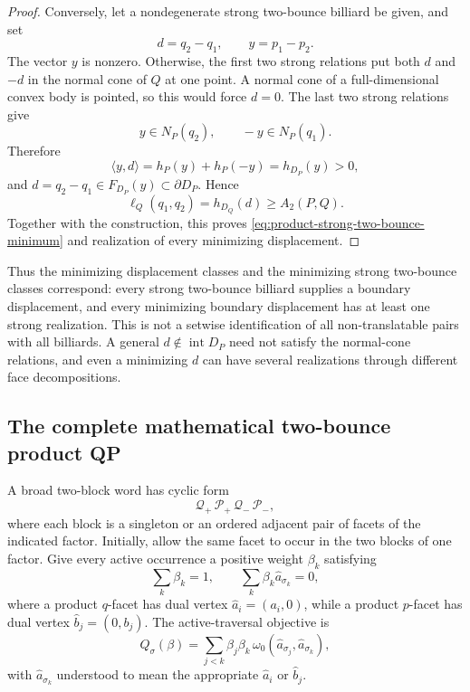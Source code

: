 \begin{unverified}
\begin{proof}
Conversely, let a nondegenerate strong two-bounce billiard be given, and set
\[
 d=q_2-q_1,\qquad y=p_1-p_2.
\]
The vector \(y\) is nonzero.  Otherwise, the first two strong relations put
both \(d\) and \(-d\) in the normal cone of \(Q\) at one point.  A normal
cone of a full-dimensional convex body is pointed, so this would force
\(d=0\).
The last two strong relations give
\[
 y\in N_P(q_2),\qquad -y\in N_P(q_1).
\]
Therefore
\[
 \langle y,d\rangle
 =h_P(y)+h_P(-y)
 =h_{D_P}(y)>0,
\]
and \(d=q_2-q_1\in F_{D_P}(y)\subset\partial D_P\).  Hence
\[
 \ell_Q(q_1,q_2)=h_{D_Q}(d)\geq A_2(P,Q).
\]
Together with the construction, this proves
\eqref{eq:product-strong-two-bounce-minimum} and realization of every
minimizing displacement.
\end{proof}
\end{unverified}

Thus the minimizing displacement classes and the minimizing strong
two-bounce classes correspond: every strong two-bounce billiard supplies a
boundary displacement, and every minimizing boundary displacement has at
least one strong realization.  This is not a setwise identification of all
non-translatable pairs with all billiards.  A general
\(d\notin\operatorname{int}D_P\) need not satisfy the normal-cone relations,
and even a minimizing \(d\) can have several realizations through different
face decompositions.

\subsection{The complete mathematical two-bounce product QP}
\label{subsec:product-two-bounce-complete-qp}

A broad two-block word has cyclic form
\[
 \mathcal Q_+\,\mathcal P_+\,\mathcal Q_-\,\mathcal P_-,
\]
where each block is a singleton or an ordered adjacent pair of facets of the
indicated factor.  Initially, allow the same facet to occur in the two blocks
of one factor.  Give every active occurrence a positive weight \(\beta_k\)
satisfying
\begin{equation}
\label{eq:product-two-bounce-qp-constraints}
 \sum_k\beta_k=1,\qquad
 \sum_k\beta_k\widehat a_{\sigma_k}=0,
\end{equation}
where a product \(q\)-facet has dual vertex
\(\widehat a_i=(a_i,0)\), while a product \(p\)-facet has dual vertex
\(\widehat b_j=(0,b_j)\).  The active-traversal objective is
\[
 Q_\sigma(\beta)
 =\sum_{j<k}\beta_j\beta_k\,
   \omega_0(\widehat a_{\sigma_j},\widehat a_{\sigma_k}),
\]
with \(\widehat a_{\sigma_k}\) understood to mean the appropriate
\(\widehat a_i\) or \(\widehat b_j\).


